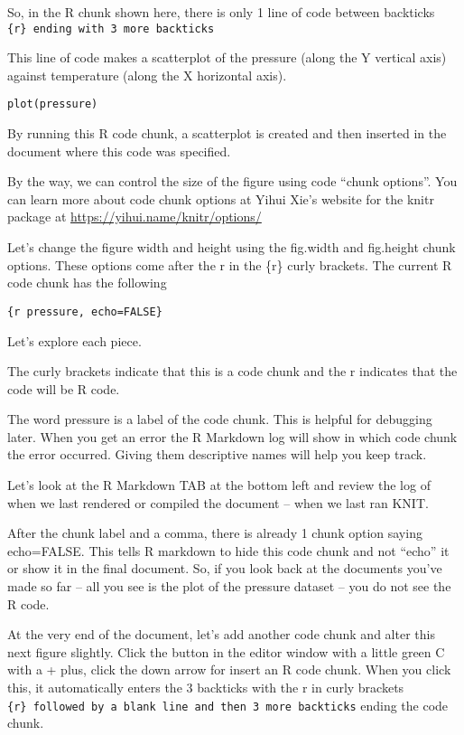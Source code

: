 \documentclass[]{book}
\theoremstyle{definition}
\theoremstyle{definition}
\theoremstyle{definition}
\theoremstyle{remark}
\begin{document}
So, in the R chunk shown here, there is only 1 line of code between
backticks \texttt{\{r\}\ ending\ with\ 3\ more\ backticks}

This line of code makes a scatterplot of the pressure (along the Y
vertical axis) against temperature (along the X horizontal axis).

\texttt{plot(pressure)}

By running this R code chunk, a scatterplot is created and then inserted
in the document where this code was specified.

By the way, we can control the size of the figure using code ``chunk
options''. You can learn more about code chunk options at Yihui Xie's
website for the knitr package at \url{https://yihui.name/knitr/options/}

Let's change the figure width and height using the fig.width and
fig.height chunk options. These options come after the r in the \{r\}
curly brackets. The current R code chunk has the following

\texttt{\{r\ pressure,\ echo=FALSE\}}

Let's explore each piece.

The curly brackets indicate that this is a code chunk and the r
indicates that the code will be R code.

The word pressure is a label of the code chunk. This is helpful for
debugging later. When you get an error the R Markdown log will show in
which code chunk the error occurred. Giving them descriptive names will
help you keep track.

Let's look at the R Markdown TAB at the bottom left and review the log
of when we last rendered or compiled the document -- when we last ran
KNIT.

After the chunk label and a comma, there is already 1 chunk option
saying echo=FALSE. This tells R markdown to hide this code chunk and not
``echo'' it or show it in the final document. So, if you look back at
the documents you've made so far -- all you see is the plot of the
pressure dataset -- you do not see the R code.

At the very end of the document, let's add another code chunk and alter
this next figure slightly. Click the button in the editor window with a
little green C with a + plus, click the down arrow for insert an R code
chunk. When you click this, it automatically enters the 3 backticks with
the r in curly brackets
\texttt{\{r\}\ followed\ by\ a\ blank\ line\ and\ then\ 3\ more\ backticks}
ending the code chunk.
\end{document}
